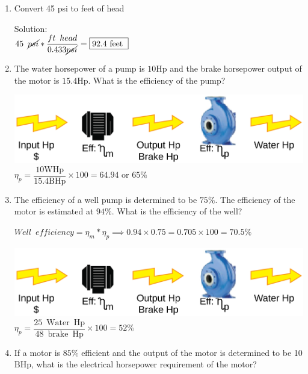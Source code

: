 \documentclass{article}
\begin{document}
\begin{enumerate}
\item Convert 45 psi to feet of head

Solution:\\ 
$
45 \enspace \cancel{psi}*\dfrac{ft \enspace head}{0.433\cancel{psi}}=\boxed{92.4 \text { feet }}
$





\item The water horsepower of a pump is $10 \mathrm{Hp}$ and the brake horsepower output of the motor is $15.4 \mathrm{Hp}$. What is the efficiency of the pump?

\vspace{0.4cm}\includegraphics[scale=0.08]{PumpProblem}\\
\vspace{0.4cm}
 $\eta_p=\dfrac{10 \mathrm{WHp}}{15.4 \mathrm{BHp}} \times 100=64.94$ or $\boxed{65 \%}$


 
\item The efficiency of a well pump is determined to be $75 \%$. The efficiency of the motor is estimated at $94 \%$. What is the efficiency of the well?

 \vspace{0.2cm}
$Well \enspace efficiency=\eta_m * \eta_p \implies 0.94 \times 0.75=0.705 \times 100=70.5 \%$
 \vspace{0.2cm}

\vspace{0.32cm}\includegraphics[scale=0.08]{PumpProblem}\\
 \vspace{0.2cm}
$\eta_p=\dfrac{25 \mathrm{\enspace Water \enspace Hp}}{48 \mathrm{\enspace brake \enspace Hp}} \times 100=52 \%$
  \vspace{0.4cm}
  
  
\item If a motor is $85 \%$ efficient and the output of the motor is determined to be 10
$\mathrm{BHp}$, what is the electrical horsepower requirement of the motor?



\end{enumerate}
\end{document}
